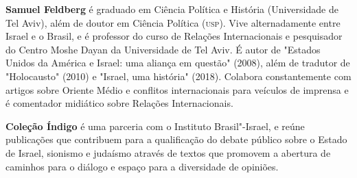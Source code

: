 \textbf{Samuel Feldberg} é graduado em Ciência Política e História (Universidade de Tel Aviv), além de doutor em Ciência Política (\textsc{usp}). Vive alternadamente entre Israel e o Brasil, e é professor do curso de Relações Internacionais e pesquisador do Centro Moshe Dayan da Universidade de Tel Aviv. É autor de "Estados Unidos da América e Israel: uma aliança em questão" (2008), além de tradutor de "Holocausto" (2010) e "Israel, uma história" (2018). Colabora constantemente com artigos sobre Oriente Médio e conflitos internacionais para veículos de imprensa e é comentador midiático sobre Relações Internacionais.

\textbf{Coleção Índigo} é uma parceria com o Instituto Brasil"-Israel, e reúne publicações que contribuem para a qualificação do debate público sobre o Estado de Israel, sionismo e judaísmo através de textos que promovem a abertura de caminhos para o diálogo e espaço para a diversidade de opiniões.

